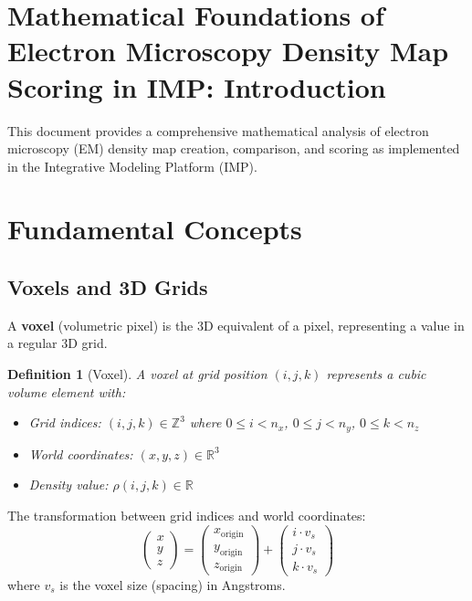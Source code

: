 \documentclass[12pt,a4paper]{article}
\newtheorem{definition}{Definition}[section]
\begin{document}
\section{Mathematical Foundations of Electron Microscopy Density Map Scoring in IMP: Introduction}
This document provides a comprehensive mathematical analysis of electron microscopy (EM) 
density map creation, comparison, and scoring as implemented in the Integrative Modeling Platform (IMP).

\section{Fundamental Concepts}

\subsection{Voxels and 3D Grids}
A \textbf{voxel} (volumetric pixel) is the 3D equivalent of a pixel, representing a value in a regular 3D grid.

\begin{definition}[Voxel]
A voxel at grid position $(i, j, k)$ represents a cubic volume element with:
\begin{itemize}
    \item Grid indices: $(i, j, k) \in \mathbb{Z}^3$ where $0 \leq i < n_x$, $0 \leq j < n_y$, $0 \leq k < n_z$
    \item World coordinates: $(x, y, z) \in \mathbb{R}^3$ 
    \item Density value: $\rho(i, j, k) \in \mathbb{R}$
\end{itemize}
\end{definition}

The transformation between grid indices and world coordinates:
\begin{equation}
\begin{pmatrix} x \\ y \\ z \end{pmatrix} = \begin{pmatrix} x_{\text{origin}} \\ y_{\text{origin}} \\ z_{\text{origin}} \end{pmatrix} + \begin{pmatrix} i \cdot v_s \\ j \cdot v_s \\ k \cdot v_s \end{pmatrix}
\end{equation}
where $v_s$ is the voxel size (spacing) in Angstroms.
\end{document}
